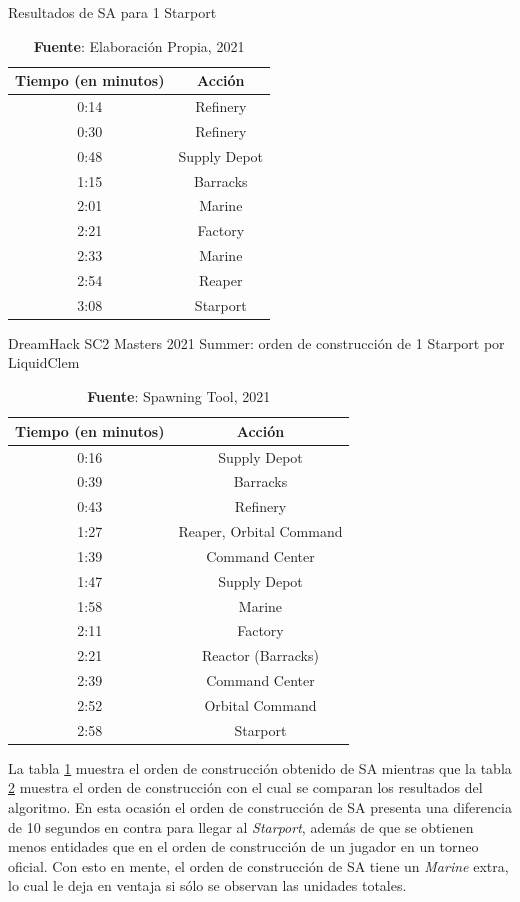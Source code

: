 \begin{table}[H]
\centering
\def\arraystretch{1.2}
\captionsetup{justification=centering}
\caption{Resultados de SA para 1 Starport}
\label{tab:5.4}
\begin{tabular}{|c|c|}
\hline
\textbf{Tiempo (en minutos)} & \textbf{Acción} \\
\hline
0:14 & Refinery \\ 
0:30 & Refinery \\ 
0:48 & Supply Depot \\ 
1:15 & Barracks \\ 
2:01 & Marine \\ 
2:21 & Factory \\
2:33 & Marine \\
2:54 & Reaper \\ 
3:08 & Starport \\ \hline
\end{tabular}
\caption*{\textbf{Fuente}: Elaboración Propia, 2021}
\end{table}

\begin{table}[H]
\centering
\def\arraystretch{1.2}
\captionsetup{justification=centering}
\caption{DreamHack SC2 Masters 2021 Summer: orden de construcción de 1 Starport por LiquidClem}
\label{tab:5.5}
\begin{tabular}{|c|c|}
\hline
\textbf{Tiempo (en minutos)} & \textbf{Acción} \\
\hline
0:16 &	  Supply Depot	  \\
0:39 &	  Barracks	  \\
0:43 &	  Refinery	  \\
1:27 &	  Reaper, Orbital Command	  \\
1:39 &	  Command Center	  \\
1:47 &	  Supply Depot	  \\
1:58 &	  Marine	  \\
2:11 &	  Factory	  \\
2:21 &	  Reactor (Barracks)	\\  
2:39 &	  Command Center	\\  
2:52 &	  Orbital Command	\\  
2:58 &	  Starport	  \\ \hline
\end{tabular}
\caption*{\textbf{Fuente}: Spawning Tool, 2021}
\end{table}

La tabla \ref{tab:5.4} muestra el orden de construcción obtenido de SA mientras que la tabla \ref{tab:5.5} muestra el orden de construcción con el cual se comparan los resultados del algoritmo. En esta ocasión el orden de construcción de SA presenta una diferencia de 10 segundos en contra para llegar al \textit{Starport}, además de que se obtienen menos entidades que en el orden de construcción de un jugador en un torneo oficial. Con esto en mente, el orden de construcción de SA tiene un \textit{Marine} extra, lo cual le deja en ventaja si sólo se observan las unidades totales.

